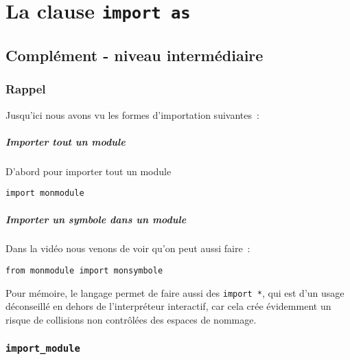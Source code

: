     
    
    
    

    

    \hypertarget{la-clause-import-as}{%
\section{\texorpdfstring{La clause
\texttt{import\ as}}{La clause import as}}\label{la-clause-import-as}}

    \hypertarget{compluxe9ment---niveau-intermuxe9diaire}{%
\subsection{Complément - niveau
intermédiaire}\label{compluxe9ment---niveau-intermuxe9diaire}}

    \hypertarget{rappel}{%
\subsubsection{Rappel}\label{rappel}}

    Jusqu'ici nous avons vu les formes d'importation suivantes~:

    \hypertarget{importer-tout-un-module}{%
\subparagraph{Importer tout un module}\label{importer-tout-un-module}}

    D'abord pour importer tout un module

    \begin{verbatim}
import monmodule
\end{verbatim}

    \hypertarget{importer-un-symbole-dans-un-module}{%
\subparagraph{Importer un symbole dans un
module}\label{importer-un-symbole-dans-un-module}}

    Dans la vidéo nous venons de voir qu'on peut aussi faire~:

    \begin{verbatim}
from monmodule import monsymbole
\end{verbatim}

    Pour mémoire, le langage permet de faire aussi des \texttt{import\ *},
qui est d'un usage déconseillé en dehors de l'interpréteur interactif,
car cela crée évidemment un risque de collisions non contrôlées des
espaces de nommage.

    \hypertarget{import_module}{%
\subsubsection{\texorpdfstring{\texttt{import\_module}}{import\_module}}\label{import_module}}

